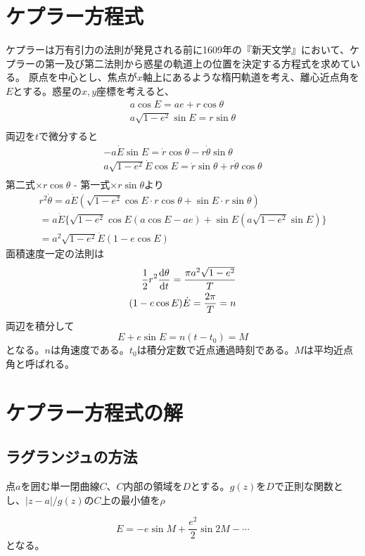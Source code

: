 
\section{ケプラー方程式}
	ケプラーは万有引力の法則が発見される前に1609年の『新天文学』において、ケプラーの第一及び第二法則から惑星の軌道上の位置を決定する方程式を求めている。
	原点を中心とし、焦点が$x$軸上にあるような楕円軌道を考え、離心近点角を$E$とする。惑星の$x, y$座標を考えると、
	\begin{gather*}
		a\cos E = ae + r\cos\theta\\
		a\sqrt{1-e^2}\sin E = r\sin\theta\\
	\end{gather*}
	両辺を$t$で微分すると
	\begin{gather*}
		- a\dot{E}\sin E = \dot{r}\cos\theta - r\dot{\theta}\sin\theta\\
		a\sqrt{1-e^2}\dot{E}\cos E = \dot{r}\sin\theta + r\dot{\theta}\cos\theta\\
	\end{gather*}
	第二式$\times r\cos\theta$ - 第一式$\times r\sin\theta$より
	\begin{align*}
		r^2\dot{\theta} = a\dot{E}( \sqrt{1-e^2}\cos E \cdot r\cos\theta + \sin E \cdot r\sin\theta)\\
		= a\dot{E}\{ \sqrt{1-e^2}\cos E (a\cos E - ae) + \sin E (a\sqrt{1-e^2}\sin E) \}\\
		= a^2\sqrt{1-e^2}\dot{E}(1 - e\cos E)
	\end{align*}
	面積速度一定の法則は
	\begin{align*}
		\frac{1}{2}r^2\de[\theta]{t} = \frac{\pi a^2\sqrt{1-e^2}}{T}\\
		(1 - e\cos E)\dot{E} = \frac{2\pi}{T} = n\\
	\end{align*}
	両辺を積分して
		\[E + e\sin E = n(t - t_0) = M\]
	となる。$n$は角速度である。$t_0$は積分定数で近点通過時刻である。$M$は平均近点角と呼ばれる。

\section{ケプラー方程式の解}
	\subsection{ラグランジュの方法}
		\begin{laglange}
			点$a$を囲む単一閉曲線$C$、$C$内部の領域を$D$とする。$g(z)$を$D$で正則な関数とし、$|z-a|/g(z)$の$C$上の最小値を$\rho$
		\end{laglange}
			\[E = -e\sin M + \frac{e^2}{2}\sin 2M - \cdots\]
		となる。
